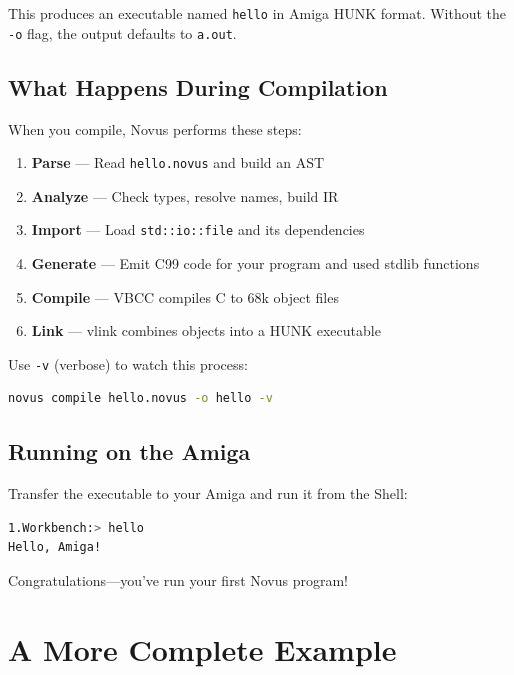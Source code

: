 This produces an executable named \texttt{hello} in Amiga HUNK format. Without the \texttt{-o} flag, the output defaults to \texttt{a.out}.

\subsection{What Happens During Compilation}

When you compile, Novus performs these steps:

\begin{enumerate}
\item \textbf{Parse} --- Read \texttt{hello.novus} and build an AST
\item \textbf{Analyze} --- Check types, resolve names, build IR
\item \textbf{Import} --- Load \texttt{std::io::file} and its dependencies
\item \textbf{Generate} --- Emit C99 code for your program and used stdlib functions
\item \textbf{Compile} --- VBCC compiles C to 68k object files
\item \textbf{Link} --- vlink combines objects into a HUNK executable
\end{enumerate}

Use \texttt{-v} (verbose) to watch this process:

\begin{lstlisting}[language=bash]
novus compile hello.novus -o hello -v
\end{lstlisting}

\subsection{Running on the Amiga}

Transfer the executable to your Amiga and run it from the Shell:

\begin{lstlisting}[language=bash]
1.Workbench:> hello
Hello, Amiga!
\end{lstlisting}

Congratulations---you've run your first Novus program!

\section{A More Complete Example}
\label{sec:complete-example}

